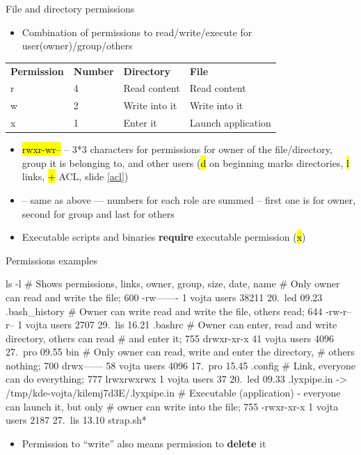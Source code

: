 \documentclass[compress, ucs, xelatex, 11pt, xcolor=svgnames,
  hyperref={
    bookmarks=true,
    unicode=true,
    colorlinks=true,
    pdftitle={Linux, command line and MetaCentrum},
    plainpages=false,
    pdfauthor={Vojtech Zeisek},
    pdfsubject={Course about use of Linux command line, writing shell scripts and using MetaCentrum of CESNET},
    pdfcreator={XeLaTeX},
    pdfkeywords={Linux, GNU, BASH, shell, command line, MetaCentrum},
    linkcolor=DarkRed,
    anchorcolor=DarkBlue,
    citecolor=Indigo,
    filecolor=NavyBlue,
    menucolor=DarkMagenta,
    urlcolor=DarkBlue,
    pdftex},
  url={hyphens, lowtilde} %
  ]{beamer}
\renewcommand{\texttt}[1]{\hl{\ttfamily #1}}
\begin{document}
\begin{frame}{File and directory permissions}
  \begin{itemize}
    \item Combination of permissions to read/write/execute for user(owner)/group/others
  \end{itemize}
  \begin{center}
    \begin{tabular}{llll}
      \textbf{Permission} & \textbf{Number} & \textbf{Directory} & \textbf{File}\\
      r & 4 & Read content & Read content\\
      w & 2 & Write into it & Write into it\\
      x & 1 & Enter it & Launch application
    \end{tabular}
  \end{center}
  \begin{itemize}
    \item \texttt{rwxr-wr--} -- 3*3 characters for permissions for owner of the file/directory, group it is belonging to, and other users (\texttt{d} on beginning marks directories, \texttt{l} links, \texttt{+} ACL, slide \ref{acl})
    \item \texttt{764} -- same as above --- numbers for each role are summed -- first one is for owner, second for group and last for others
    \item Executable scripts and binaries \textbf{require} executable permission (\texttt{x})
  \end{itemize}
\end{frame}

\begin{frame}[fragile]{Permissions examples}
  \begin{bashcode}
    ls -l # Shows permissions, links, owner, group, size, date, name
    # Only owner can read and write the file; 600
    -rw-------   1 vojta users   38211 20. led 09.23 .bash_history
    # Owner can write read and write the file, others read; 644
    -rw-r--r--   1 vojta users    2707 29. lis 16.21 .bashrc
    # Owner can enter, read and write directory, others can read
    # and enter it; 755
    drwxr-xr-x  41 vojta users    4096 27. pro 09.55 bin
    # Only owner can read, write and enter the directory,
    # others nothing; 700
    drwx------  58 vojta users    4096 17. pro 15.45 .config
    # Link, everyone can do everything; 777
    lrwxrwxrwx   1 vojta users      37 20. led 09.33 .lyxpipe.in ->
      /tmp/kde-vojta/kilemj7d3E/.lyxpipe.in
    # Executable (application) - everyone can launch it, but only
    # owner can write into the file; 755
    -rwxr-xr-x   1 vojta users    2187 27. lis 13.10 strap.sh*
  \end{bashcode}
  \vfil
  \begin{itemize}
    \item Permission to ``write'' also means permission to \textbf{delete} it
  \end{itemize}
\end{frame}
\end{document}
